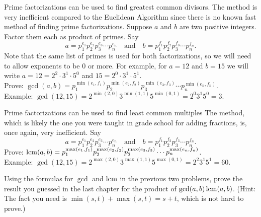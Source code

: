 \begin{prob}
Prime factorizations can be used to find greatest common divisors. The method is very inefficient compared to the Euclidean Algorithm since there is no known fast method of finding prime factorizations. Suppose $a$ and $b$ are two positive integers. Factor them each as product of primes. Say
\[ 
a = p_{1}^{e_{1}}p_{2}^{e_{2}}p_{3}^{e_{3}}\cdots p_{n}^{e_{n}} \quad\text{and}\quad b = p_{1}^{f_{1}}p_{2}^{f_{2}}p_{3}^{f_{3}}\cdots p_{n}^{f_{n}}.
\]
Note that the same list of primes is used for both factorizations, so we will need to allow exponents to be $0$ or more. For example, for 
$a = 12$ and $b = 15$ we will write $a = 12 = 2^{2}\cdot 3^{1}\cdot 5^{0}$ and $15 = 2^{0}\cdot 3^{1}\cdot5^{1}$.\\[3pt]
Prove: $\gcd(a,b) = p_{1}^{\min(e_{1},f_{1})}p_{2}^{\min(e_{2},f_{2})}p_{3}^{\min(e_{3},f_{3})}\cdots p_{n}^{\min(e_{n},f_{n})}$.\\[3pt]
Example: $\gcd(12,15) = 2^{\min(2,0)}3^{\min(1,1)}5^{\min(0,1)} = 2^{0}3^{1}5^{0}= 3$.
\end{prob}

\begin{prob}
Prime factorizations can be used to find least common multiples  The method, which is likely the one you were taught in grade school for adding fractions,  is, once again, very inefficient.  Say
\[ 
a = p_{1}^{e_{1}}p_{2}^{e_{2}}p_{3}^{e_{3}}\cdots p_{n}^{e_{n}} \quad\text{and}\quad b = p_{1}^{f_{1}}p_{2}^{f_{2}}p_{3}^{f_{3}}\cdots p_{n}^{f_{n}}.
\] 
Prove: $\operatorname{lcm}(a,b) = p_{1}^{\max(e_{1},f_{1})}p_{2}^{\max(e_{2},f_{2})}p_{3}^{\max(e_{3},f_{3})}\cdots p_{n}^{\max(e_{n},f_{n})}$.\\[3pt]
Example: $\gcd(12,15) = 2^{\max(2,0)}3^{\max(1,1)}5^{\max(0,1)} = 2^{2}3^{1}5^{1}= 60$.
\end{prob}

\begin{prob}
Using the formulas for $\gcd$ and $\operatorname{lcm}$ in the previous two problems, prove the result you guessed in the last chapter for the product
of $\gcd(a,b)\operatorname{lcm}(a,b)$. (Hint: The fact you need is $\min(s,t) + \max(s,t) = s+t$, which is not hard to prove.)
\end{prob}



